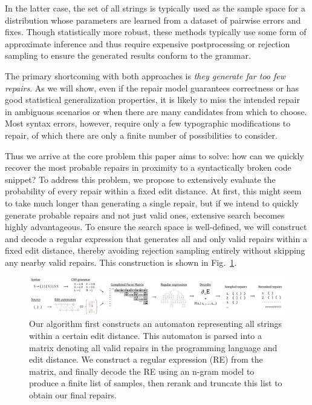 \documentclass[sigplan,review,acmsmall,nonacm,screen,anonymous]{acmart}\settopmatter{printfolios=false,printccs=false,printacmref=false}
\begin{document}
In the latter case, the set of all strings is typically used as the sample space for a distribution whose parameters are learned from a dataset of pairwise errors and fixes. Though statistically more robust, these methods typically use some form of approximate inference and thus require expensive postprocessing or rejection sampling to ensure the generated results conform to the grammar.

The primary shortcoming with both approaches is \textit{they generate far too few repairs}. As we will show, even if the repair model guarantees correctness or has good statistical generalization properties, it is likely to miss the intended repair in ambiguous scenarios or when there are many candidates from which to choose. Most syntax errors, however, require only a few typographic modifications to repair, of which there are only a finite number of possibilities to consider.

Thus we arrive at the core problem this paper aims to solve: how can we quickly recover the most probable repairs in proximity to a syntactically broken code snippet? To address this problem, we propose to extensively evaluate the probability of every repair within a fixed edit distance. At first, this might seem to take much longer than generating a single repair, but if we intend to quickly generate probable repairs and not just valid ones, extensive search becomes highly advantageous. To ensure the search space is well-defined, we will construct and decode a regular expression that generates all and only valid repairs within a fixed edit distance, thereby avoiding rejection sampling entirely without skipping any nearby valid repairs. This construction is shown in Fig.~\ref{fig:arch_simp}.

\begin{figure}[H]
  \includegraphics[width=\textwidth]{flow}\vspace{-0.1cm}
  \caption{
    Our algorithm first constructs an automaton representing all strings within a certain edit distance. This automaton is parsed into a matrix denoting all valid repairs in the programming language and edit distance. We construct a regular expression (RE) from the matrix, and finally decode the RE using an n-gram model to produce a finite list of samples, then rerank and truncate this list to obtain our final repairs.
  }\label{fig:arch_simp}\vspace{-0.2cm}
\end{figure}
\end{document}
